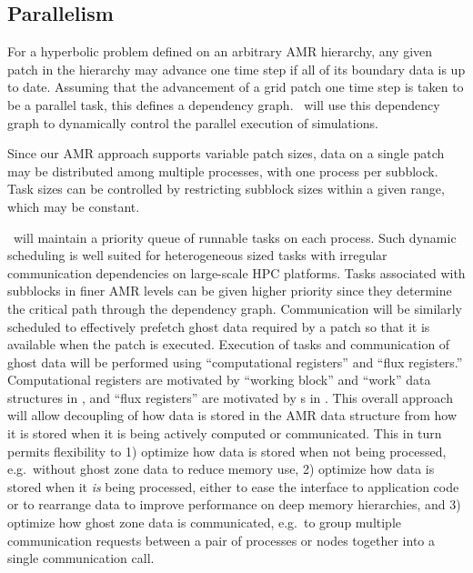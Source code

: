 \documentclass[11pt,letterpaper]{article}
\begin{document}
\subsection{Parallelism} \label{ss:design-parallel}

For a hyperbolic problem defined on an arbitrary AMR hierarchy, any
given patch in the hierarchy may advance one time step if all of its
boundary data is up to date.  Assuming that the advancement of a grid
patch one time step is taken to be a parallel task, this defines a
dependency graph.  \cello\ will use this dependency graph to
dynamically control the parallel execution of simulations.
%
%

Since
our AMR approach supports variable patch sizes, data on a single
patch may be distributed among multiple processes, with one process
per subblock.
Task sizes can be controlled by
restricting subblock sizes within a given range, which may be
constant.

%
\cello\ will maintain a priority
queue of runnable tasks on each process.  Such dynamic scheduling is
well suited for heterogeneous sized tasks with irregular
communication dependencies on large-scale HPC platforms.
Tasks associated with subblocks in finer
AMR levels can be given higher priority since they determine the
critical path through the dependency graph.  Communication will be
similarly scheduled to effectively prefetch ghost data required by a
patch so that it is available when the patch is executed.
%
Execution of tasks and communication
of ghost data will be performed using ``computational registers'' and
``flux registers.''  Computational registers are motivated by
``working block'' and ``work'' data structures in \paramesh, and
``flux registers'' are motivated by s in
\chombo.  This overall approach will allow decoupling of how data is
stored in the AMR data structure from how it is stored when it is
being actively computed or communicated.  This in turn permits
flexibility to 1) optimize how data is stored when not being
processed, e.g.~without ghost zone data to reduce memory use, 2)
optimize how data is stored when it \textit{is} being processed,
either to ease the interface to application code or to rearrange data to
improve performance on deep memory hierarchies, and 3) optimize how
ghost zone data is communicated, e.g.~to group multiple communication
requests between a pair of processes or nodes together into a single
communication call.
\end{document}
